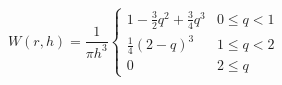 \documentclass[12pt]{article}
\begin{document}
\[
  W\left( r,h \right) = \frac{1}{\pi h^3} \begin{cases} 1-\frac{3}{2} q^2 + \frac{3}{4} q^3 & 0 \leq q < 1 \\
                                                        \frac{1}{4} \left( 2-q \right)^3    & 1 \leq q < 2 \\
                                                        0 & 2 \leq q
                                          \end{cases}
\]  
\end{document}
